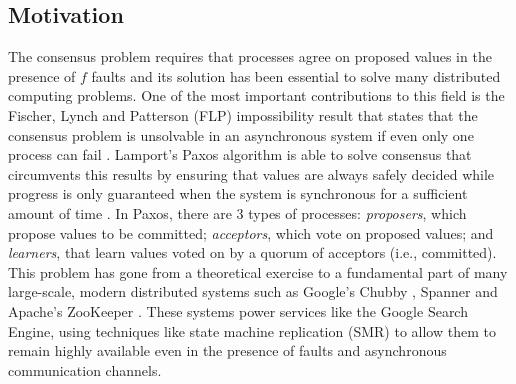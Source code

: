 \documentclass[runningheads,a4paper]{llncs}
\begin{document}
\subsection{Motivation}
The consensus problem requires that processes agree on proposed values in the presence of $f$ faults and its solution has been essential to solve many distributed computing problems. One of the most important contributions to this field is the Fischer, Lynch and Patterson (FLP) impossibility result that states that the consensus problem is unsolvable in an asynchronous system if even only one process can fail \cite{Fischer1985}. Lamport's Paxos algorithm is able to solve consensus that circumvents this results by ensuring that values are always safely decided while progress is only guaranteed when the system is synchronous for a sufficient amount of time \cite{Lamport2001}. In Paxos, there are 3 types of processes: \textit{proposers}, which propose values to be committed; \textit{acceptors}, which vote on proposed values; and \textit{learners}, that learn values voted on by a quorum of acceptors (i.e., committed). This problem has gone from a theoretical exercise to a fundamental part of many large-scale, modern distributed systems such as Google's Chubby \cite{Burrows2006}, Spanner \cite{Corbett2012} and Apache's ZooKeeper \cite{Junqueira2011}. These systems power services like the Google Search Engine, using techniques like state machine replication (SMR) to allow them to remain highly available even in the presence of faults and asynchronous communication channels. \par
\end{document}
